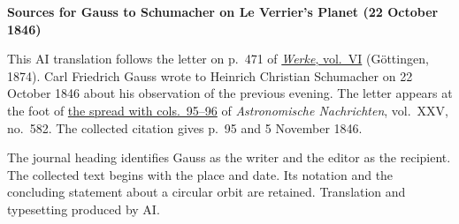 \clearpage\thispagestyle{empty}
\begin{center}\textbf{Sources for Gauss to Schumacher on Le Verrier’s Planet (22 October 1846)}\end{center}
\noindent This AI translation follows the letter on p.~471 of \href{https://gdz.sub.uni-goettingen.de/id/PPN236007467}{\textit{Werke}, vol.~VI} (Göttingen, 1874). Carl Friedrich Gauss wrote to Heinrich Christian Schumacher on 22 October 1846 about his observation of the previous evening. The letter appears at the foot of \href{https://api.digitale-sammlungen.de/iiif/image/v2/bsb10049450_00056/full/1800,/0/default.jpg}{the spread with cols.~95--96} of \textit{Astronomische Nachrichten}, vol.~XXV, no.~582. The collected citation gives p.~95 and 5 November 1846.
\par\smallskip\noindent The journal heading identifies Gauss as the writer and the editor as the recipient. The collected text begins with the place and date. Its notation and the concluding statement about a circular orbit are retained. Translation and typesetting produced by AI.
\clearpage
